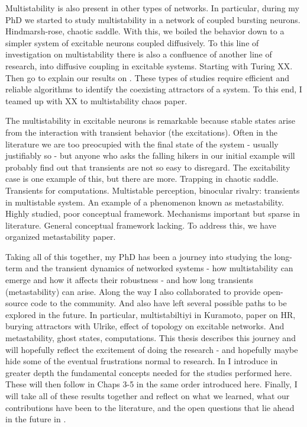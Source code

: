Multistability is also present in other types of networks. In particular, during my PhD we started to study multistability in a network of coupled bursting neurons. Hindmarsh-rose, chaotic saddle. With this, we boiled the behavior down to a simpler system of excitable neurons coupled diffusively. To this line of investigation on multistability there is also a confluence of another line of research, into diffusive coupling in excitable systems. Starting with Turing XX. Then go to explain our results on . These types of studies require efficient and reliable algorithms to  identify the coexisting attractors of a system. To this end, I teamed up with XX to multistability chaos paper.


The multistability in excitable neurons is remarkable because stable states arise from the interaction with transient behavior (the excitations). Often in the literature we are too preocupied with the final state of the system - usually justifiably so - but anyone who asks the falling hikers in our initial example will probably find out that transients are not so easy to disregard. The excitability case is one example of this, but there are more. Trapping in chaotic saddle. Transients for computations. Multistable perception, binocular rivalry: transients in multistable system. An example of a phenomenon known as metastability. Highly studied, poor conceptual framework. Mechanisms important but sparse in literature. General conceptual framework lacking. To address this, we have organized metastability paper. 


Taking all of this together, my PhD has been a journey into studying the long-term and the transient dynamics of networked systems - how multistability can emerge and how it affects their robustness - and how long transients (metastability) can arise. Along the way I also collaborated to provide open-source code to the community. And also have left several possible paths to be explored in the future. In particular, multistabiltiyi in Kuramoto, paper on HR, burying attractors with Ulrike, effect of topology on excitable networks. And metastability, ghost states, computations. This thesis describes this journey and will hopefully reflect the excitement of doing the research - and hopefully maybe hide some of the eventual frustrations normal to research. In  I introduce in greater depth the fundamental concepts needed for the studies performed here. These will then follow in Chaps 3-5 in the same order introduced here. Finally, I will take all of these results together and reflect on what we learned, what our contributions have been to the literature, and the open questions that lie ahead in the future in . 

